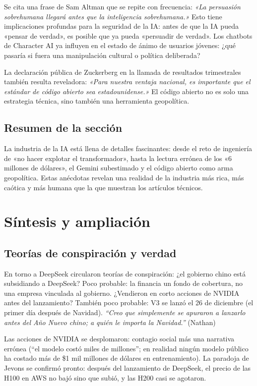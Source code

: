 \documentclass[a4paper]{article}
\begin{document}
Se cita una frase de Sam Altman que se repite con frecuencia: \textit{«La persuasión sobrehumana llegará antes que la inteligencia sobrehumana.»} Esto tiene implicaciones profundas para la seguridad de la IA: antes de que la IA pueda «pensar de verdad», es posible que ya pueda «persuadir de verdad». Los chatbots de Character AI ya influyen en el estado de ánimo de usuarios jóvenes: ¿qué pasaría si fuera una manipulación cultural o política deliberada?

La declaración pública de Zuckerberg en la llamada de resultados trimestrales también resulta reveladora: \textit{«Para nuestra ventaja nacional, es importante que el estándar de código abierto sea estadounidense.»} El código abierto no es solo una estrategia técnica, sino también una herramienta geopolítica.

\subsection{Resumen de la sección}

La industria de la IA está llena de detalles fascinantes: desde el reto de ingeniería de «no hacer explotar el transformador», hasta la lectura errónea de los «6 millones de dólares», el Gemini subestimado y el código abierto como arma geopolítica. Estas anécdotas revelan una realidad de la industria más rica, más caótica y más humana que la que muestran los artículos técnicos.
\section{Síntesis y ampliación}

\subsection{Teorías de conspiración y verdad}

En torno a DeepSeek circularon teorías de conspiración: ¿el gobierno chino está subsidiando a DeepSeek? Poco probable: la financia un fondo de cobertura, no una empresa vinculada al gobierno. ¿Vendieron en corto acciones de NVIDIA antes del lanzamiento? También poco probable: V3 se lanzó el 26 de diciembre (el primer día después de Navidad). \textit{``Creo que simplemente se apuraron a lanzarlo antes del Año Nuevo chino; a quién le importa la Navidad.''} (Nathan)

Las acciones de NVIDIA se desplomaron: contagio social más una narrativa errónea (``el modelo costó miles de millones''; en realidad ningún modelo público ha costado más de \$1 mil millones de dólares en entrenamiento). La paradoja de Jevons se confirmó pronto: después del lanzamiento de DeepSeek, el precio de las H100 en AWS no bajó sino que subió, y las H200 casi se agotaron.
\end{document}
